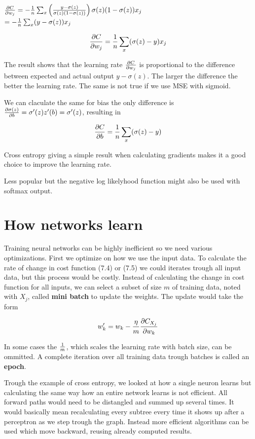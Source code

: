 \({\partial C \over \partial w_j} = -{1 \over n}\sum_x \left ( {y - \sigma(z) \over \sigma(z) (1-\sigma(z))}\right ) \sigma(z)(1 - \sigma(z)) x_j \)\\
\(= -{1 \over n}\sum_x(y - \sigma(z))x_j\)

\[{\partial C \over \partial w_j} = {1 \over n}\sum_x(\sigma(z) - y)x_j\]

The result shows that the learning rate \({\partial C \over \partial w_j}\) is proportional to the difference between expected and actual output \(y - \sigma(z)\). The larger the difference the better the learning rate. The same is not true if we use MSE with sigmoid.

We can claculate the same for bias the only difference is \({\partial \sigma(z) \over \partial b} = \sigma'(z) z'(b) = \sigma'(z)\), resulting in

\[{\partial C \over \partial b} = {1 \over n}\sum_x(\sigma(z) - y)\]

Cross entropy giving a simple result when calculating gradients makes it a good choice to improve the learning rate.

Less popular but the negative log likelyhood function might also be used with softmax output.

\section{How networks learn}

Training neural networks can be highly inefficient so we need various optimizations. First we optimize on how we use the input data. To calculate the rate of change in cost function (7.4) or (7.5) we could iterates trough all input data, but this process would be costly. Instead of calculating the change in cost function for all inputs, we can select a subset of size \(m\) of training data, noted with \(X_j\), called \textbf{mini batch} to update the weights. The update would take the form

\[w_k' = w_k - {\eta \over m} { \partial C_{X_j} \over \partial w_k} \]

In some cases the \(1 \over m\), which scales the learning rate with batch size, can be ommitted. A complete iteration over all training data trough batches is called an \textbf{epoch}.

Trough the example of cross entropy, we looked at how a single neuron learns but calculating the same way how an entire network learns is not efficient. All forward paths would need to be distangled and summed up several times. It would basically mean recalculating every subtree every time it shows up after a perceptron as we step trough the graph. Instead more efficient algorithms can be used which move backward, reusing already computed results.

